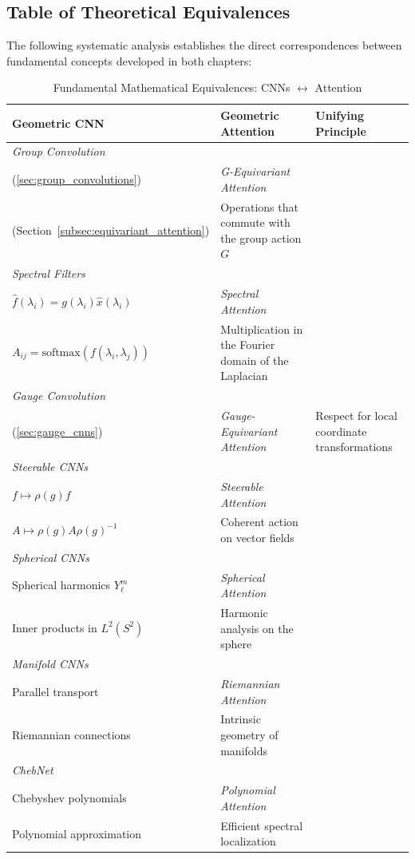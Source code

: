 \subsection{Table of Theoretical Equivalences}\label{subsec:tabla_equivalencias}

The following systematic analysis establishes the direct correspondences between fundamental concepts developed in both chapters:

\begin{table}[H]
\centering
\caption{Fundamental Mathematical Equivalences: CNNs $\leftrightarrow$ Attention}
\label{tab:cnn_attention_equivalencias_fundamentales}
\begin{tabular}{|p{4cm}|p{4cm}|p{6cm}|}
\hline
\textbf{Geometric CNN} & \textbf{Geometric Attention} & \textbf{Unifying Principle} \\
\hline\hline
\textit{Group Convolution} \\
(\autoref{sec:group_convolutions}) & \textit{G-Equivariant Attention} \\
(Section~\ref{subsec:equivariant_attention}) & Operations that commute with the group action $G$ \\
\hline
\textit{Spectral Filters} \\
$\hat{f}(\lambda_i) = g(\lambda_i) \hat{x}(\lambda_i)$ & \textit{Spectral Attention} \\
$A_{ij} = \text{softmax}(f(\lambda_i, \lambda_j))$ & Multiplication in the Fourier domain of the Laplacian \\
\hline
\textit{Gauge Convolution} \\
(\autoref{sec:gauge_cnns}) & \textit{Gauge-Equivariant Attention} & Respect for local coordinate transformations \\
\hline
\textit{Steerable CNNs} \\
$f \mapsto \rho(g) f$ & \textit{Steerable Attention} \\
$A \mapsto \rho(g) A \rho(g)^{-1}$ & Coherent action on vector fields \\
\hline
\textit{Spherical CNNs} \\
Spherical harmonics $Y_\ell^m$ & \textit{Spherical Attention} \\
Inner products in $L^2(S^2)$ & Harmonic analysis on the sphere \\
\hline
\textit{Manifold CNNs} \\
Parallel transport & \textit{Riemannian Attention} \\
Riemannian connections & Intrinsic geometry of manifolds \\
\hline
\textit{ChebNet} \\
Chebyshev polynomials & \textit{Polynomial Attention} \\
Polynomial approximation & Efficient spectral localization \\
\hline
\end{tabular}
\end{table}

